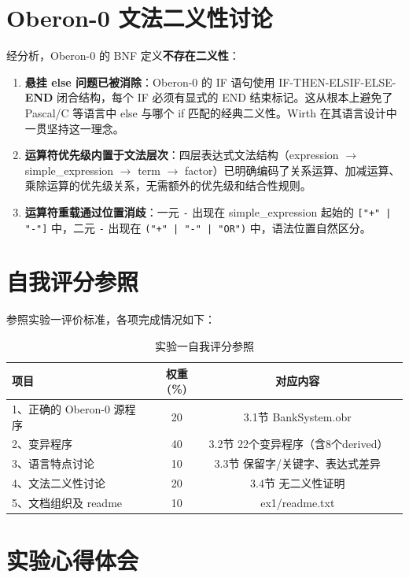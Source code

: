\section{Oberon-0 文法二义性讨论}

经分析，Oberon-0 的 BNF 定义\textbf{不存在二义性}：

\begin{enumerate}
    \item \textbf{悬挂 else 问题已被消除}：Oberon-0 的 IF 语句使用 IF-THEN-ELSIF-ELSE-\textbf{END} 闭合结构，每个 IF 必须有显式的 END 结束标记。这从根本上避免了 Pascal/C 等语言中 else 与哪个 if 匹配的经典二义性。Wirth 在其语言设计中一贯坚持这一理念。
    \item \textbf{运算符优先级内置于文法层次}：四层表达式文法结构（expression $\to$ simple\_expression $\to$ term $\to$ factor）已明确编码了关系运算、加减运算、乘除运算的优先级关系，无需额外的优先级和结合性规则。
    \item \textbf{运算符重载通过位置消歧}：一元 \texttt{-} 出现在 simple\_expression 起始的 \texttt{["+" | "-"]} 中，二元 \texttt{-} 出现在 \texttt{("+" | "-" | "OR")} 中，语法位置自然区分。
\end{enumerate}

\section{自我评分参照}

参照实验一评价标准，各项完成情况如下：

\begin{table}[htbp]
    \centering
    \begin{tabular}{|p{4.5cm}|c|c|p{4.5cm}|}
    \hline
    \textbf{项目} & \textbf{权重(\%)} & \textbf{对应内容} \\
    \hline
    1、正确的 Oberon-0 源程序 & 20 & 3.1节 BankSystem.obr \\
    2、变异程序 & 40 & 3.2节 22个变异程序（含8个derived） \\
    3、语言特点讨论 & 10 & 3.3节 保留字/关键字、表达式差异 \\
    4、文法二义性讨论 & 20 & 3.4节 无二义性证明 \\
    5、文档组织及 readme & 10 & ex1/readme.txt \\
    \hline
    \end{tabular}
    \caption{实验一自我评分参照}
    \label{tab:self-eval-ex1}
\end{table}

\section{实验心得体会}

